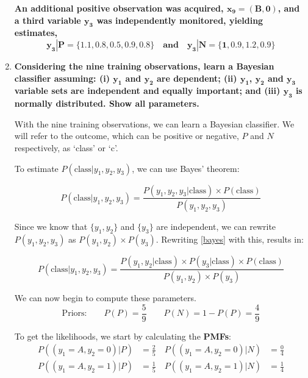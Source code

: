 \documentclass[12pt]{article}
\begin{document}
\begin{enumerate}[leftmargin=\labelsep]
    \vspace{15pt}
    \textbf{An additional positive observation was acquired, $\boldsymbol{x_9 = (B,0)}$, and a third variable $\boldsymbol{y_3}$
    was independently monitored, yielding estimates,}
    \[
    \boldsymbol{y_3|P = \{1.1, 0.8, 0.5, 0.9, 0.8\} \quad and \quad y_3|N = \{1, 0.9, 1.2, 0.9\}}
    \]

    \item \textbf{Considering the nine training observations, learn a Bayesian classifier assuming:
    (i) $\boldsymbol{y_1}$ and $\boldsymbol{y_2}$ are dependent; (ii) {$\boldsymbol{y_1}$, $\boldsymbol{y_2}$} and {$\boldsymbol{y_3}$} variable sets are independent and equally
    important; and (iii) $\boldsymbol{y_3}$ is normally distributed. Show all parameters.}

    \vspace{10pt} 
    With the nine training observations, we can learn a Bayesian classifier.
    We will refer to the outcome, which can be positive or negative, $P$ and $N$ respectively, as `class' or `c'.

    \vspace{10pt} 
    To estimate $P(\text{class} | y_1, y_2, y_3)$, we can use Bayes' theorem:

    \begin{equation}\label{bayes}
        P(\text{class}| y_1, y_2, y_3) = \frac{P(y_1, y_2, y_3 | \text{class}) \times P(\text{class})}{P(y_1, y_2, y_3)}
    \end{equation}

    Since we know that $\{y_1, y_2\}$ and $\{y_3\}$ are independent,
    we can rewrite $P(y_1, y_2, y_3)$ as $P(y_1, y_2) \times P(y_3)$.
    Rewriting \eqref{bayes} with this, results in:

    \begin{equation}\label{bayes2}
        P(\text{class}| y_1, y_2, y_3) = \frac{P(y_1, y_2 | \text{class}) \times P(y_3 | \text{class}) \times P(\text{class})}{P(y_1, y_2) \times P(y_3)}
    \end{equation}

    \vspace{10pt}
    We can now begin to compute these parameters.
    \vspace{10pt}
    \begin{equation*}
        \text{Priors:} \qquad
        P(P) = \frac{5}{9} \quad \quad P(N) = 1- P(P) = \frac{4}{9} 
    \end{equation*}

    \vspace{10pt}
    To get the likelihoods, we start by calculating the \textbf{PMFs}:
    \begin{equation*}
        \begin{aligned}
        P((y_1 = A, y_2 = 0)|P) &= \frac{2}{5} \quad P((y_1 = A, y_2 = 0)|N) &= \frac{0}{4}
        \\
        P((y_1 = A, y_2 = 1)|P) &= \frac{1}{5} \quad P((y_1 = A, y_2 = 1)|N) &= \frac{1}{4} 
        \end{aligned}
    \end{equation*}


\end{enumerate}
\end{document}
